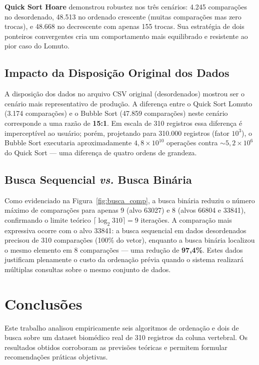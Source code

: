 \documentclass[12pt]{article}
\begin{document}
\textbf{Quick Sort Hoare} demonstrou robustez nos três cenários: 4.245 comparações no desordenado, 48.513 no ordenado crescente (muitas comparações mas zero trocas), e 48.668 no decrescente com apenas 155 trocas. Sua estratégia de dois ponteiros convergentes cria um comportamento mais equilibrado e resistente ao pior caso do Lomuto.

\subsection{Impacto da Disposição Original dos Dados}

A disposição dos dados no arquivo CSV original (desordenados) mostrou ser o cenário mais representativo de produção. A diferença entre o Quick Sort Lomuto (3.174 comparações) e o Bubble Sort (47.859 comparações) neste cenário corresponde a uma razão de \textbf{15:1}. Em escala de 310 registros essa diferença é imperceptível ao usuário; porém, projetando para 310.000 registros (fator $10^3$), o Bubble Sort executaria aproximadamente $4,8 \times 10^{10}$ operações contra $\sim 5,2 \times 10^6$ do Quick Sort --- uma diferença de quatro ordens de grandeza.

\subsection{Busca Sequencial \textit{vs.} Busca Binária}

Como evidenciado na Figura~\ref{fig:busca_comp}, a busca binária reduziu o número máximo de comparações para apenas 9 (alvo 63027) e 8 (alvos 66804 e 33841), confirmando o limite teórico $\lceil \log_2 310 \rceil = 9$ iterações. A comparação mais expressiva ocorre com o alvo 33841: a busca sequencial em dados desordenados precisou de 310 comparações (100\% do vetor), enquanto a busca binária localizou o mesmo elemento em 8 comparações --- uma redução de \textbf{97,4\%}. Estes dados justificam plenamente o custo da ordenação prévia quando o sistema realizará múltiplas consultas sobre o mesmo conjunto de dados.

\section{Conclusões}
\label{sec:conclusao}

Este trabalho analisou empiricamente seis algoritmos de ordenação e dois de busca sobre um dataset biomédico real de 310 registros da coluna vertebral. Os resultados obtidos corroboram as previsões teóricas e permitem formular recomendações práticas objetivas.
\end{document}
